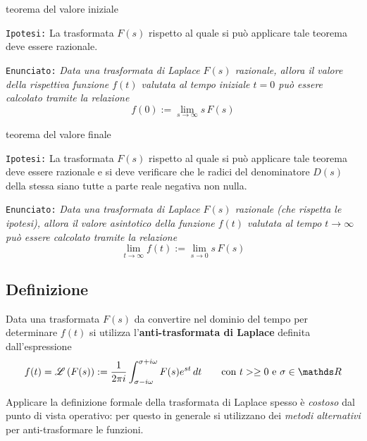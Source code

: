 		\begin{teorema}{teorema del valore iniziale} \label{teor:valiniziale}
			
			\texttt{Ipotesi:} La trasformata $F(s)$ rispetto al quale si può applicare tale teorema deve essere razionale. \vspace{3mm}
			
			\texttt{Enunciato:} \textit{Data una trasformata di Laplace $F(s)$ razionale, allora il valore della rispettiva funzione $f(t)$ valutata al tempo iniziale $t = 0$ può essere calcolato tramite la relazione}
			\begin{equation}
				f(0) := \lim_{s\rightarrow \infty} s\,F(s)
			\end{equation}
		\end{teorema}
	
		\begin{teorema}{teorema del valore finale} \label{teor:valfinale}
		
			\texttt{Ipotesi:} La trasformata $F(s)$ rispetto al quale si può applicare tale teorema deve essere razionale e si deve verificare che le radici del denominatore $D(s)$ della stessa siano tutte a parte reale negativa non nulla. \vspace{3mm}
			
			\texttt{Enunciato:} \textit{Data una trasformata di Laplace $F(s)$ razionale (che rispetta le ipotesi), allora il valore asintotico della funzione $f(t)$ valutata al tempo $t\rightarrow \infty$ può essere calcolato tramite la relazione}
			\begin{equation}
				\lim_{t\rightarrow \infty}f(t) := \lim_{s\rightarrow 0} s\,F(s)
			\end{equation}
		\end{teorema}
	
	\subsection{Definizione}
		\begin{concetto}
			Data una trasformata $F(s)$ da convertire nel dominio del tempo per determinare $f(t)$ si utilizza l'\textbf{anti-trasformata di Laplace} definita dall'espressione
			\begin{equation}
				f(t) = \trasf{F(s)} := \frac{1}{2\pi i} \int_{\sigma-i\omega}^{\sigma+i\omega} F(s) e^{st} \, dt \qquad \textrm{con $t>\geq 0$ e } \sigma \in \mathds R
			\end{equation}
		\end{concetto}
		Applicare la definizione formale della trasformata di Laplace spesso è \textit{costoso} dal punto di vista operativo: per questo in generale si utilizzano dei \textit{metodi alternativi} per anti-trasformare le funzioni.
		
